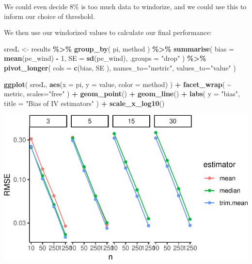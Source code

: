 \documentclass[
]{book}
\newenvironment{Shaded}{\begin{snugshade}}{\end{snugshade}}
\newcommand{\AttributeTok}[1]{\textcolor[rgb]{0.13,0.29,0.53}{#1}}
\newcommand{\DecValTok}[1]{\textcolor[rgb]{0.00,0.00,0.81}{#1}}
\newcommand{\FunctionTok}[1]{\textcolor[rgb]{0.13,0.29,0.53}{\textbf{#1}}}
\newcommand{\NormalTok}[1]{#1}
\newcommand{\OtherTok}[1]{\textcolor[rgb]{0.56,0.35,0.01}{#1}}
\newcommand{\SpecialCharTok}[1]{\textcolor[rgb]{0.81,0.36,0.00}{\textbf{#1}}}
\newcommand{\StringTok}[1]{\textcolor[rgb]{0.31,0.60,0.02}{#1}}
\begin{document}
We could even decide 8\% is too much data to windorize, and we could use this to inform our choice of threshold.

We then use our windorized values to calculate our final performance:

\begin{Shaded}
\begin{Highlighting}[]
\NormalTok{sresL }\OtherTok{\textless{}{-}}\NormalTok{ results }\SpecialCharTok{\%\textgreater{}\%}
  \FunctionTok{group\_by}\NormalTok{( pi, method ) }\SpecialCharTok{\%\textgreater{}\%}
  \FunctionTok{summarise}\NormalTok{( }
    \AttributeTok{bias =} \FunctionTok{mean}\NormalTok{(pe\_wind) }\SpecialCharTok{{-}} \DecValTok{1}\NormalTok{,}
    \AttributeTok{SE =} \FunctionTok{sd}\NormalTok{(pe\_wind), }\AttributeTok{.groups =} \StringTok{"drop"}\NormalTok{ ) }\SpecialCharTok{\%\textgreater{}\%}
  \FunctionTok{pivot\_longer}\NormalTok{(}
    \AttributeTok{cols =} \FunctionTok{c}\NormalTok{(bias, SE ),}
    \AttributeTok{names\_to=}\StringTok{"metric"}\NormalTok{,}
    \AttributeTok{values\_to=}\StringTok{"value"}\NormalTok{ )}

\FunctionTok{ggplot}\NormalTok{( sresL, }\FunctionTok{aes}\NormalTok{(}\AttributeTok{x =}\NormalTok{ pi, }\AttributeTok{y =}\NormalTok{ value, }\AttributeTok{color =}\NormalTok{ method) ) }\SpecialCharTok{+}
  \FunctionTok{facet\_wrap}\NormalTok{( }\SpecialCharTok{\textasciitilde{}}\NormalTok{ metric, }\AttributeTok{scales=}\StringTok{"free"}\NormalTok{ ) }\SpecialCharTok{+}
  \FunctionTok{geom\_point}\NormalTok{() }\SpecialCharTok{+} \FunctionTok{geom\_line}\NormalTok{() }\SpecialCharTok{+}
  \FunctionTok{labs}\NormalTok{( }\AttributeTok{y =} \StringTok{"bias"}\NormalTok{, }\AttributeTok{title =} \StringTok{"Bias of IV estimators"}\NormalTok{ ) }\SpecialCharTok{+}
  \FunctionTok{scale\_x\_log10}\NormalTok{()}
\end{Highlighting}
\end{Shaded}

\begin{center}\includegraphics[width=0.75\linewidth]{Designing-Simulations-in-R_files/figure-latex/unnamed-chunk-180-1} \end{center}
\end{document}
